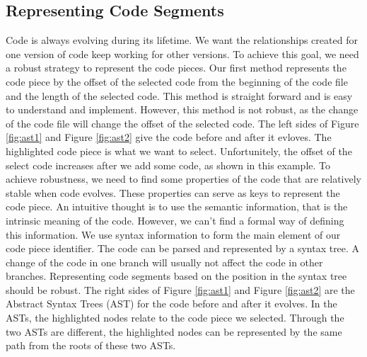 \documentclass[runningheads,a4paper]{llncs}
\begin{document}
\subsection{Representing Code Segments}
Code is always evolving during its lifetime.
We want the relationships created for one version of code keep working for other versions.
To achieve this goal, we need a robust strategy to represent the code pieces.
Our first method represents the code piece by the offset of the selected code from the beginning of the code file and the length of the selected code.
This method is straight forward and is easy to understand and implement.
However, this method is not robust,
as the change of the code file will change the offset of the selected code.
The left sides of Figure \ref{fig:ast1} and Figure \ref{fig:ast2} give the code before and after it evloves.
The highlighted code piece is what we want to select.
Unfortunitely, the offset of the select code increases after we add some code,
as shown in this example.
To achieve robustness, we need to find some properties of the code that are relatively stable when code evolves.
These properties can serve as keys to represent the code piece.
An intuitive thought is to use the semantic information,
that is the intrinsic meaning of the code.
However, we can't find a formal way of defining this information.
We use syntax information to form the main element of our code piece identifier.
The code can be parsed and represented by a syntax tree.
A change of the code in one branch will usually not affect the code in other branches.
Representing code segments based on the position in the syntax tree should be robust.
The right sides of Figure \ref{fig:ast1} and Figure \ref{fig:ast2} are the Abstract Syntax Trees (AST) for the code before and after it evolves.
In the ASTs, the highlighted nodes relate to the code piece we selected.
Through the two ASTs are different, 
the highlighted nodes can be represented by the same path from the roots of these two ASTs.
\end{document}
